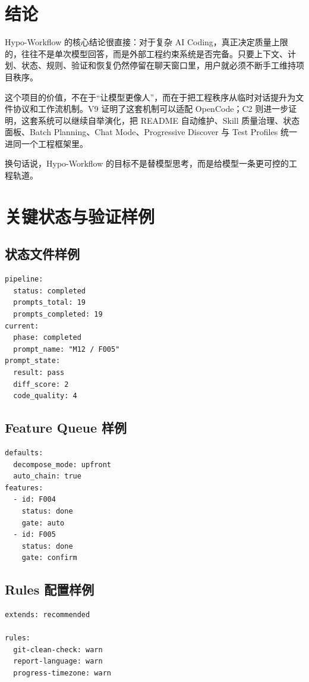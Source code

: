 \documentclass[
  outputdir=build,
  chapterstyle=cn,
  colorscheme=Simple,
  fontset=tech,
  code=false
]{Hypo-Note}
\begin{document}
\chapter{结论}

Hypo-Workflow 的核心结论很直接：对于复杂 AI Coding，真正决定质量上限的，往往不是单次模型回答，而是外部工程约束系统是否完备。只要上下文、计划、状态、规则、验证和恢复仍然停留在聊天窗口里，用户就必须不断手工维持项目秩序。

这个项目的价值，不在于“让模型更像人”，而在于把工程秩序从临时对话提升为文件协议和工作流机制。V9 证明了这套机制可以适配 OpenCode；C2 则进一步证明，这套系统可以继续自举演化，把 README 自动维护、Skill 质量治理、状态面板、Batch Planning、Chat Mode、Progressive Discover 与 Test Profiles 统一进同一个工程框架里。

换句话说，Hypo-Workflow 的目标不是替模型思考，而是给模型一条更可控的工程轨道。

\appendix

\chapter{关键状态与验证样例}

\section{状态文件样例}

\begin{lstlisting}[language={}]
pipeline:
  status: completed
  prompts_total: 19
  prompts_completed: 19
current:
  phase: completed
  prompt_name: "M12 / F005"
prompt_state:
  result: pass
  diff_score: 2
  code_quality: 4
\end{lstlisting}

\section{Feature Queue 样例}

\begin{lstlisting}[language={}]
defaults:
  decompose_mode: upfront
  auto_chain: true
features:
  - id: F004
    status: done
    gate: auto
  - id: F005
    status: done
    gate: confirm
\end{lstlisting}

\section{Rules 配置样例}

\begin{lstlisting}[language={}]
extends: recommended

rules:
  git-clean-check: warn
  report-language: warn
  progress-timezone: warn
\end{lstlisting}
\end{document}
